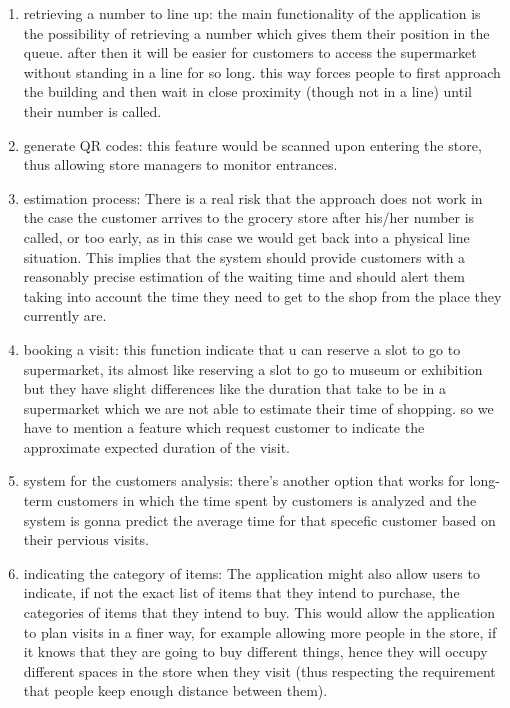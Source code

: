 \begin{enumerate}
    \item retrieving a number to line up: the main functionality of the application is the possibility of retrieving a number  which gives them their position in the queue. after then it will be easier for customers to access the supermarket without standing in a line for so long.  this way  forces people to first approach the building and then wait in close proximity (though not in a line) until their number is called.

    \item generate QR codes:  this feature would be scanned upon entering the store, thus allowing store managers to monitor entrances.

    \item estimation process:  There is a real risk that the approach does not
    work in the case the customer arrives to the grocery store after his/her number is called, or too early, as in this case we would get back into a physical line situation. This implies that the system should provide customers with a reasonably precise estimation of the waiting time and should alert them taking into account the time they need to get to the shop from the place they currently are.

    \item booking a visit: this function indicate that u can reserve a slot to go to supermarket, its almost like reserving a slot to go to museum or exhibition but they have slight differences like the duration that take to be in a supermarket which we are not able to estimate their time of shopping. so we have to mention a feature which request customer to indicate the approximate expected duration of the visit.

    \item system for the customers analysis: there's another option that works for long-term customers in which the time spent by customers is analyzed and the system is gonna predict the average time for that specefic customer based on their pervious visits.

    \item indicating the category of items: The application might also allow users to indicate, if not the exact list of items that they intend to
    purchase, the categories of items that they intend to buy. This would allow the application to plan visits in a finer way, for example allowing more people in the store, if it knows that they are going to buy different things, hence they will occupy different spaces in the store when they visit (thus respecting the requirement that people keep enough distance between them).
\end{enumerate}